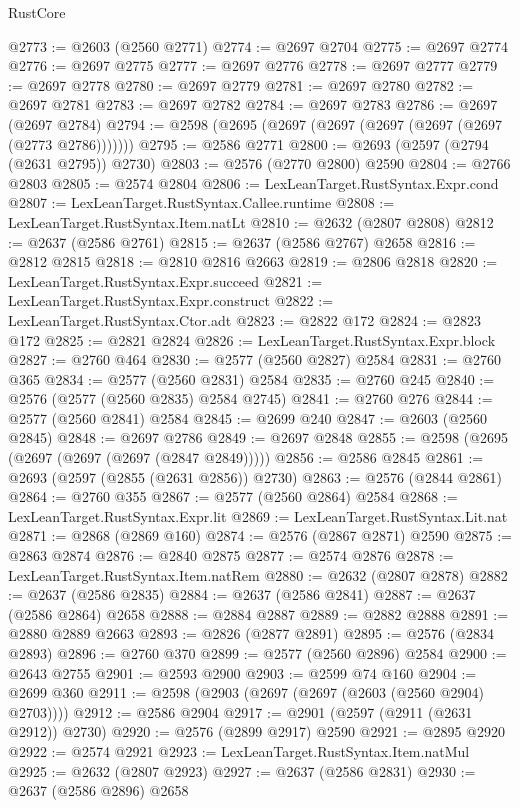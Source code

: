\begin{lexlean}{RustCore}
\begin{coremodule}
@2773 := @2603 (@2560 @2771)
@2774 := @2697 @2704
@2775 := @2697 @2774
@2776 := @2697 @2775
@2777 := @2697 @2776
@2778 := @2697 @2777
@2779 := @2697 @2778
@2780 := @2697 @2779
@2781 := @2697 @2780
@2782 := @2697 @2781
@2783 := @2697 @2782
@2784 := @2697 @2783
@2786 := @2697 (@2697 @2784)
@2794 := @2598 (@2695 (@2697 (@2697 (@2697 (@2697 (@2697 (@2773 @2786)))))))
@2795 := @2586 @2771
@2800 := @2693 (@2597 (@2794 (@2631 @2795)) @2730)
@2803 := @2576 (@2770 @2800) @2590
@2804 := @2766 @2803
@2805 := @2574 @2804
@2806 := LexLeanTarget.RustSyntax.Expr.cond
@2807 := LexLeanTarget.RustSyntax.Callee.runtime
@2808 := LexLeanTarget.RustSyntax.Item.natLt
@2810 := @2632 (@2807 @2808)
@2812 := @2637 (@2586 @2761)
@2815 := @2637 (@2586 @2767) @2658
@2816 := @2812 @2815
@2818 := @2810 @2816 @2663
@2819 := @2806 @2818
@2820 := LexLeanTarget.RustSyntax.Expr.succeed
@2821 := LexLeanTarget.RustSyntax.Expr.construct
@2822 := LexLeanTarget.RustSyntax.Ctor.adt
@2823 := @2822 @172
@2824 := @2823 @172
@2825 := @2821 @2824
@2826 := LexLeanTarget.RustSyntax.Expr.block
@2827 := @2760 @464
@2830 := @2577 (@2560 @2827) @2584
@2831 := @2760 @365
@2834 := @2577 (@2560 @2831) @2584
@2835 := @2760 @245
@2840 := @2576 (@2577 (@2560 @2835) @2584 @2745)
@2841 := @2760 @276
@2844 := @2577 (@2560 @2841) @2584
@2845 := @2699 @240
@2847 := @2603 (@2560 @2845)
@2848 := @2697 @2786
@2849 := @2697 @2848
@2855 := @2598 (@2695 (@2697 (@2697 (@2697 (@2847 @2849)))))
@2856 := @2586 @2845
@2861 := @2693 (@2597 (@2855 (@2631 @2856)) @2730)
@2863 := @2576 (@2844 @2861)
@2864 := @2760 @355
@2867 := @2577 (@2560 @2864) @2584
@2868 := LexLeanTarget.RustSyntax.Expr.lit
@2869 := LexLeanTarget.RustSyntax.Lit.nat
@2871 := @2868 (@2869 @160)
@2874 := @2576 (@2867 @2871) @2590
@2875 := @2863 @2874
@2876 := @2840 @2875
@2877 := @2574 @2876
@2878 := LexLeanTarget.RustSyntax.Item.natRem
@2880 := @2632 (@2807 @2878)
@2882 := @2637 (@2586 @2835)
@2884 := @2637 (@2586 @2841)
@2887 := @2637 (@2586 @2864) @2658
@2888 := @2884 @2887
@2889 := @2882 @2888
@2891 := @2880 @2889 @2663
@2893 := @2826 (@2877 @2891)
@2895 := @2576 (@2834 @2893)
@2896 := @2760 @370
@2899 := @2577 (@2560 @2896) @2584
@2900 := @2643 @2755
@2901 := @2593 @2900
@2903 := @2599 @74 @160
@2904 := @2699 @360
@2911 := @2598 (@2903 (@2697 (@2697 (@2603 (@2560 @2904) @2703))))
@2912 := @2586 @2904
@2917 := @2901 (@2597 (@2911 (@2631 @2912)) @2730)
@2920 := @2576 (@2899 @2917) @2590
@2921 := @2895 @2920
@2922 := @2574 @2921
@2923 := LexLeanTarget.RustSyntax.Item.natMul
@2925 := @2632 (@2807 @2923)
@2927 := @2637 (@2586 @2831)
@2930 := @2637 (@2586 @2896) @2658

\end{coremodule}
\end{lexlean}
